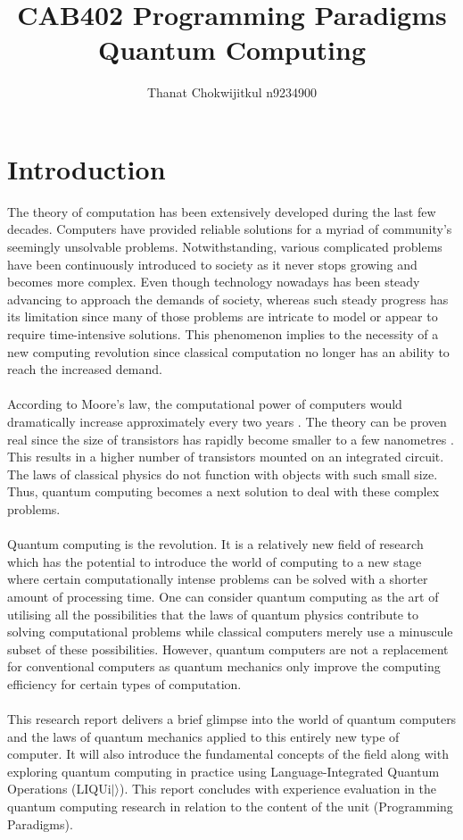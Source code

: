\documentclass[12pt]{third-rep}
\title{CAB402 Programming Paradigms \\ \vspace{2 mm} {Quantum Computing}}
\author{Thanat Chokwijitkul n9234900}
\date{}
\begin{document}
\maketitle %

\tableofcontents


\chapter{Introduction}

The theory of computation has been extensively developed during the last few decades. Computers have provided reliable solutions for a myriad of community's seemingly unsolvable problems. Notwithstanding, various complicated problems have been continuously introduced to society as it never stops growing and becomes more complex. Even though technology nowadays has been steady advancing to approach the demands of society, whereas such steady progress has its limitation since many of those problems are intricate to model or appear to require time-intensive solutions. This phenomenon implies to the necessity of a new computing revolution since classical computation no longer has an ability to reach the increased demand. \\\\
According to Moore's law, the computational power of computers would dramatically increase approximately every two years \cite{moore}. The theory can be proven real since the size of transistors has rapidly become smaller to a few nanometres \cite{qc-info}. This results in a higher number of transistors mounted on an integrated circuit. The laws of classical physics do not function with objects with such small size. Thus, quantum computing becomes a next solution to deal with these complex problems. \\\\
Quantum computing is the revolution. It is a relatively new field of research which has the potential to introduce the world of computing to a new stage where certain computationally intense problems can be solved with a shorter amount of processing time. One can consider quantum computing as the art of utilising all the possibilities that the laws of quantum physics contribute to solving computational problems while classical computers merely use a minuscule subset of these possibilities. However, quantum computers are not a replacement for conventional computers as quantum mechanics only improve the computing efficiency for certain types of computation. \\\\
This research report delivers a brief glimpse into the world of quantum computers and the laws of quantum mechanics applied to this entirely new type of computer. It will also introduce the fundamental concepts of the field along with exploring quantum computing in practice using Language-Integrated Quantum Operations (LIQUi$\mid\rangle$). This report concludes with experience evaluation in the quantum computing research in relation to the content of the unit (Programming Paradigms).
\end{document}
